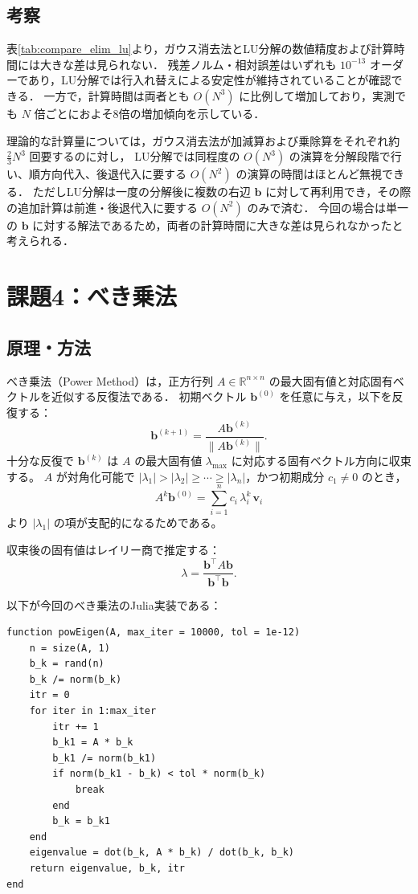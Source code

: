 \documentclass[a4paper,11pt]{ltjsarticle}
\begin{document}
\subsection{考察}
表\ref{tab:compare_elim_lu}より，ガウス消去法とLU分解の数値精度および計算時間には大きな差は見られない．
残差ノルム・相対誤差はいずれも $10^{-13}$ オーダーであり，LU分解では行入れ替えによる安定性が維持されていることが確認できる．
一方で，計算時間は両者とも $O(N^3)$ に比例して増加しており，実測でも $N$ 倍ごとにおよそ8倍の増加傾向を示している．

理論的な計算量については，ガウス消去法が加減算および乗除算をそれぞれ約 $\frac{2}{3}N^3$ 回要するのに対し，
LU分解では同程度の $O(N^3)$ の演算を分解段階で行い、順方向代入、後退代入に要する $O(N^2)$ の演算の時間はほとんど無視できる．
ただしLU分解は一度の分解後に複数の右辺 $\boldsymbol{b}$ に対して再利用でき，その際の追加計算は前進・後退代入に要する $O(N^2)$ のみで済む．
今回の場合は単一の $\boldsymbol{b}$ に対する解法であるため，両者の計算時間に大きな差は見られなかったと考えられる．
\section{課題4：べき乗法}
\subsection{原理・方法}

べき乗法（Power Method）は，正方行列 $A\in\mathbb{R}^{n\times n}$ の最大固有値と対応固有ベクトルを近似する反復法である\cite{exp2025}．
初期ベクトル $\boldsymbol{b}^{(0)}$ を任意に与え，以下を反復する：
\[
  \boldsymbol{b}^{(k+1)}=\frac{A\boldsymbol{b}^{(k)}}{\|A\boldsymbol{b}^{(k)}\|}.
\]
十分な反復で $\boldsymbol{b}^{(k)}$ は $A$ の最大固有値 $\lambda_{\mathrm{max}}$ に対応する固有ベクトル方向に収束する。
$A$ が対角化可能で $|\lambda_{1}|>|\lambda_{2}|\ge\cdots\ge|\lambda_{n}|$，かつ初期成分 $c_{1}\neq0$ のとき，
\[
  A^{k}\boldsymbol{b}^{(0)}=\sum_{i=1}^{n} c_{i}\,\lambda_{i}^{k}\,\boldsymbol{v}_{i}
\]
より $|\lambda_{1}|$ の項が支配的になるためである。

収束後の固有値はレイリー商で推定する：
\[
  \lambda=\frac{\boldsymbol{b}^{\top}A\boldsymbol{b}}{\boldsymbol{b}^{\top}\boldsymbol{b}}.
\]

以下が今回のべき乗法のJulia実装である：
\begin{verbatim}
function powEigen(A, max_iter = 10000, tol = 1e-12)
    n = size(A, 1)
    b_k = rand(n)
    b_k /= norm(b_k)
    itr = 0
    for iter in 1:max_iter
        itr += 1
        b_k1 = A * b_k
        b_k1 /= norm(b_k1)
        if norm(b_k1 - b_k) < tol * norm(b_k)
            break
        end
        b_k = b_k1
    end
    eigenvalue = dot(b_k, A * b_k) / dot(b_k, b_k)
    return eigenvalue, b_k, itr
end
\end{verbatim}
\end{document}
